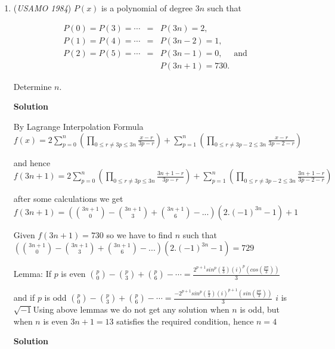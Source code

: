\begin{enumerate}
 


 


	\item (\textit{USAMO 1984}) $P(x)$ is a polynomial of degree $3n$ such that


 
 \begin{eqnarray*} P(0) = P(3) = \cdots &=& P(3n) = 2, \\ P(1) = P(4) = \cdots &=& P(3n-2) = 1, \\ P(2) = P(5) = \cdots &=& P(3n-1) = 0, \quad\text{ and }\\ && P(3n+1) = 730.\end{eqnarray*}


 Determine $n$.


 



\textbf{Solution}

By Lagrange Interpolation Formula $f(x) = 2\sum_{p=0}^{n}\left ( \prod_{0\leq r\neq3p\leq 3n}^{{}}\frac{x-r}{3p-r} \right )+ \sum_{p=1}^{n}\left ( \prod_{0\leq r\neq3p-2\leq 3n}^{{}} \frac{x-r}{3p-2-r}\right )$

 and hence $f(3n+1) = 2\sum_{p=0}^{n}\left ( \prod_{0\leq r\neq3p\leq 3n}^{{}}\frac{3n+1-r}{3p-r} \right )+ \sum_{p=1}^{n}\left ( \prod_{0\leq r\neq3p-2\leq 3n}^{{}} \frac{3n+1-r}{3p-2-r}\right )$

 after some calculations we get $f(3n+1) =\left ( \binom{3n+1}{0}- \binom{3n+1}{3}+\binom{3n+1}{6}- ... \right )\left ( 2.(-1)^{3n}-1 \right )+1$

 Given $f(3n+1)= 730$ so we have to find $n$ such that $\left ( \binom{3n+1}{0}- \binom{3n+1}{3}+\binom{3n+1}{6}- ... \right )\left ( 2.(-1)^{3n}-1 \right )= 729$

 Lemma: If $p$ is even  $\binom{p}{0}- \binom{p}{3}+ \binom{p}{6}- \cdots = \frac{2^{p+1}sin^{p}\left ( \frac{\pi}{3} \right )(i)^{p}\left ( cos\left ( \frac{p\pi}{3} \right ) \right )}{3}$

 and if  $p$ is odd  $\binom{p}{0}- \binom{p}{3}+ \binom{p}{6}- \cdots = \frac{-2^{p+1}sin^{p}\left ( \frac{\pi}{3} \right )(i)^{p+1}\left ( sin\left ( \frac{p\pi}{3} \right ) \right )}{3}$
$i$ is $\sqrt{-1}$Using above lemmas we do not get any solution when $n$ is odd, but when $n$ is even $3n+1=13$ satisfies the required condition, hence $n=4$




\textbf{Solution}


\end{enumerate}
